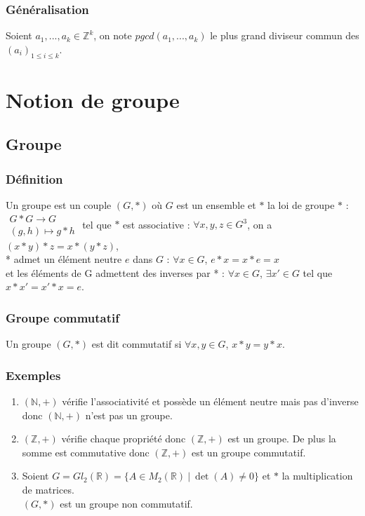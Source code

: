 \documentclass[a4paper,10pt]{book} %
\newcommand{\R}{\mathbb{R}}
\newcommand{\N}{\mathbb{N}}
\newcommand{\Z}{\mathbb{Z}}
\newcommand{\tq}{~|~}
\begin{document}
\subsubsection{Généralisation}
Soient $a_1,...,a_k\in \Z^k$, on note $pgcd(a_1,...,a_k)$ le plus grand diviseur commun des $(a_i)_{1\leq i\leq k}$.

\newpage

\section{Notion de groupe}
\subsection{Groupe}
\subsubsection{Définition}
Un groupe est un couple $(G,*)$ où $G$ est un ensemble et $*$ la loi de groupe $*$ : $\begin{array}{rcl}
G* G\rightarrow G \\
(g,h) \mapsto g* h
\end{array}$
tel que $*$ est associative : $\forall x,y,z\in G^3$, on a $(x* y)* z=x* (y* z)$,\\
* admet un élément neutre $e$ dans $G$ : $\forall x\in G$, $e* x=x* e=x$\\
et les éléments de G admettent des inverses par * : $\forall x\in G$, $\exists x'\in G$ tel que $x* x'=x'* x=e$.

\subsubsection{Groupe commutatif}
Un groupe $(G,*)$ est dit commutatif si $\forall x,y\in G$, $x*y=y*x$.

\subsubsection{Exemples}
\begin{enumerate}
\item $(\N, +)$ vérifie l'associativité et possède un élément neutre mais pas d'inverse donc $(\N,+)$ n'est pas un groupe.
\item $(\Z, +)$ vérifie chaque propriété donc $(\Z,+)$ est un groupe. De plus la somme est commutative donc $(\Z,+)$ est un groupe commutatif.
\item Soient $G=Gl_2(\R)=\{A\in M_2(\R) \tq \det(A)\neq 0\}$ et $*$ la multiplication de matrices.\\
$(G,*)$ est un groupe non commutatif.
\end{enumerate}
\end{document}
